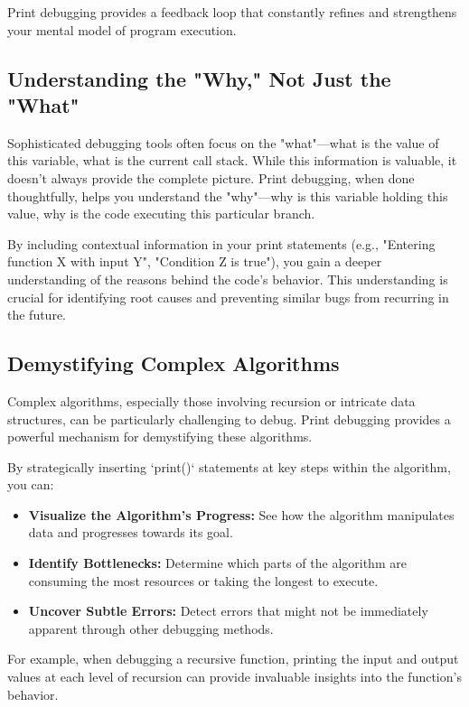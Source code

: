 \documentclass{article}
\begin{document}
{{{{Print debugging provides a feedback loop that constantly refines and strengthens your mental model of program execution.

\subsection*{Understanding the "Why," Not Just the "What"}

Sophisticated debugging tools often focus on the "what"—what is the value of this variable, what is the current call stack. While this information is valuable, it doesn't always provide the complete picture. Print debugging, when done thoughtfully, helps you understand the "why"—why is this variable holding this value, why is the code executing this particular branch.

By including contextual information in your print statements (e.g., "Entering function X with input Y", "Condition Z is true"), you gain a deeper understanding of the reasons behind the code's behavior. This understanding is crucial for identifying root causes and preventing similar bugs from recurring in the future.

\subsection*{Demystifying Complex Algorithms}

Complex algorithms, especially those involving recursion or intricate data structures, can be particularly challenging to debug. Print debugging provides a powerful mechanism for demystifying these algorithms.

By strategically inserting `print()` statements at key steps within the algorithm, you can:

\begin{itemize}
    \item \textbf{Visualize the Algorithm's Progress:} See how the algorithm manipulates data and progresses towards its goal.
    \item \textbf{Identify Bottlenecks:} Determine which parts of the algorithm are consuming the most resources or taking the longest to execute.
    \item \textbf{Uncover Subtle Errors:} Detect errors that might not be immediately apparent through other debugging methods.
\end{itemize}

For example, when debugging a recursive function, printing the input and output values at each level of recursion can provide invaluable insights into the function's behavior.

}}}}
\end{document}
